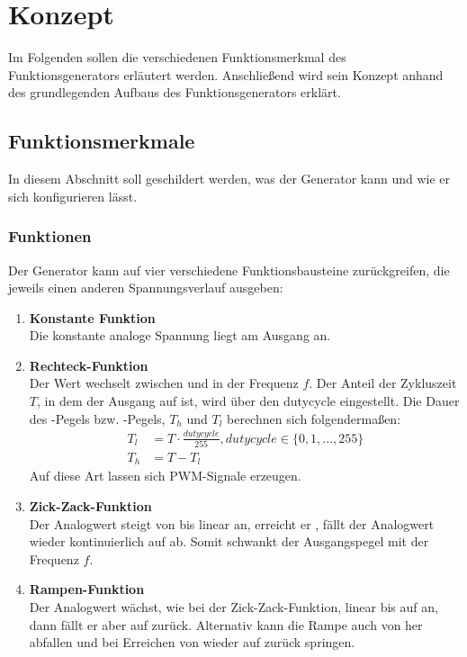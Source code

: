 \chapter{Konzept}
Im Folgenden sollen die verschiedenen Funktionsmerkmal des Funktionsgenerators erläutert werden. Anschließend wird sein Konzept anhand des grundlegenden Aufbaus des Funktionsgenerators erklärt.
 
\section{Funktionsmerkmale} \label{Concept:Feature}
In diesem Abschnitt soll geschildert werden, was der Generator kann und wie er sich konfigurieren lässt. 

\subsection{Funktionen} \label{Concept:Feature:Func}
Der Generator kann auf vier verschiedene Funktionsbausteine zurückgreifen, die jeweils einen anderen Spannungsverlauf ausgeben:

\begin{enumerate}
   \item \textbf{Konstante Funktion} \\ 
    Die konstante analoge Spannung  liegt am Ausgang an.
  \item \textbf{Rechteck-Funktion} \\
    Der Wert wechselt zwischen  und  in der Frequenz $f$.
    Der Anteil der Zykluszeit $T$, in dem der Ausgang auf  ist, wird über den dutycycle eingestellt.
    Die Dauer des -Pegels bzw. -Pegels, $T_{h}$ und $T_{l}$ berechnen sich folgendermaßen:
    \begin{align}
      T_{l} &= T \cdot \frac{dutycycle}{255}, dutycycle \in \{0, 1, ..., 255\} \\
      T_{h} &= T - T_{l} 
    \end{align}
    Auf diese Art lassen sich PWM-Signale erzeugen.
  \item \textbf{Zick-Zack-Funktion} \\
    Der Analogwert steigt von  bis  linear an, erreicht er , fällt der Analogwert wieder kontinuierlich auf  ab. Somit schwankt der Ausgangspegel mit der Frequenz $f$.
  \item \textbf{Rampen-Funktion} \\
    Der Analogwert wächst, wie bei der Zick-Zack-Funktion, linear bis auf  an, dann fällt er aber auf  zurück.
    Alternativ kann die Rampe auch von  her abfallen und bei Erreichen von  wieder auf  zurück springen.
\end{enumerate}

